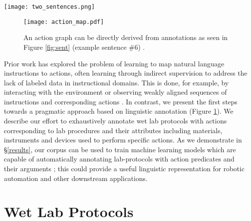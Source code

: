 \documentclass[11pt,a4paper]{article}
\begin{document}
\begin{figure*}
   \centerline{ \texttt{[image: two\_sentences.png]}}
 \caption{Example sentences (\#5 and \#6) from the lab protocol in Figure \ref{fig:protocol} as shown in the BRAT annotation interface.}
 
 \label{fig:sent}
\end{figure*}

\begin{figure}[ht]
 
  \centering
    \texttt{[image: action\_map.pdf]}
 \caption{An action graph can be directly derived from annotations as seen in Figure \ref{fig:sent} (example sentence \#6) .}
 \label{fig:graph}
\end{figure}


Prior work has explored the problem of learning to map natural language instructions to actions, often learning through indirect supervision to address the lack of labeled data in instructional domains.  This is done, for example, by interacting with the environment \cite{branavan2009reinforcement,branavan2010reading} or observing weakly aligned sequences of instructions and corresponding actions \cite{chen2011learning,artzi2013weakly}.
In contrast, we present the first steps towards a pragmatic approach based on linguistic annotation (Figure \ref{fig:graph}). We describe our effort to exhaustively annotate wet lab protocols with actions corresponding to lab procedures and their attributes including materials, instruments and devices used to perform specific actions.  As we demonstrate in \S \ref{results}, our corpus can be used to train machine learning models which are capable of automatically annotating lab-protocols with action predicates and their arguments \cite{gildea2002automatic,das2014frame}; this could provide a useful linguistic representation for robotic automation \cite{bollini2013interpreting} and other downstream applications. 




\section{Wet Lab Protocols}
\end{document}
